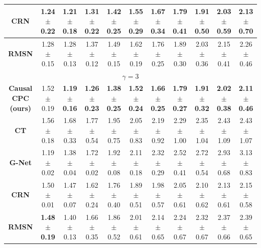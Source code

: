 \documentclass{article}
\theoremstyle{plain}
\theoremstyle{definition}
\theoremstyle{remark}
\begin{document}
\begin{table}[!htbp]
{\begin{tabular}{|c|c|c|c|c|c|c|c|c|c|c|}
\hline 
\textbf{CRN} & \textbf{1.24$\pm$0.22} & \textbf{1.21$\pm$0.18} & \textbf{1.31$\pm$0.22} & 1.42$\pm$0.25 & 1.55$\pm$0.29 & 1.67$\pm$0.34 & 1.79$\pm$0.41 & 1.91$\pm$0.50 & 2.03$\pm$0.59 & 2.13$\pm$0.70\\
\hline 
\textbf{RMSN} & 1.28$\pm$0.15 & 1.28$\pm$0.13 & 1.37$\pm$0.12 & 1.49$\pm$0.15 & 1.62$\pm$0.19 & 1.76$\pm$0.25 & 1.89$\pm$0.30 & 2.03$\pm$0.36 & 2.15$\pm$0.41 & 2.26$\pm$0.46\\
\hline
 \multicolumn{11}{|c|}{$ \gamma = 3$} \\
 \hline
\textbf{Causal CPC (ours)} & 1.52$\pm$0.19 & \textbf{1.19$\pm$0.16} & \textbf{1.26$\pm$0.23} & \textbf{1.38$\pm$0.25} & \textbf{1.52$\pm$0.24} & \textbf{1.66$\pm$0.25} & \textbf{1.79$\pm$0.27} & \textbf{1.91$\pm$0.32} & \textbf{2.02$\pm$0.38} & \textbf{2.11$\pm$0.46}\\
\hline  
\textbf{CT} & 1.56$\pm$0.18 & 1.68$\pm$0.33 & 1.77$\pm$0.54 & 1.95$\pm$0.75 & 2.05$\pm$0.83 & 2.19$\pm$0.92 & 2.29$\pm$1.00 & 2.35$\pm$1.04 & 2.43$\pm$1.09 & 2.43$\pm$1.07\\ 
\hline 
\textbf{G-Net} & 1.19$\pm$0.02 & 1.38$\pm$0.04 & 1.72$\pm$0.02 & 1.92$\pm$0.08 & 2.11$\pm$0.18 & 2.32$\pm$0.29 & 2.52$\pm$0.41 & 2.72$\pm$0.54 & 2.93$\pm$0.68 & 3.13$\pm$0.83\\
\hline 
\textbf{CRN} & 1.50$\pm$0.01 & 1.47$\pm$0.07 & 1.62$\pm$0.24 & 1.76$\pm$0.40 & 1.89$\pm$0.51 & 1.98$\pm$0.57 & 2.05$\pm$0.61 & 2.10$\pm$0.62 & 2.13$\pm$0.61 & 2.15$\pm$0.58\\
\hline 
\textbf{RMSN} & \textbf{1.48$\pm$0.19} & 1.40$\pm$0.13 & 1.66$\pm$0.35 & 1.86$\pm$0.52 & 2.01$\pm$0.61 & 2.14$\pm$0.65 & 2.24$\pm$0.67 & 2.32$\pm$0.67 & 2.37$\pm$0.66 & 2.39$\pm$0.65\\
\hline
 \end{tabular}
 }
\end{table}
\end{document}
